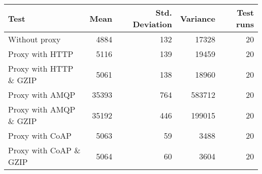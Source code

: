 \begin{tabular}{lrrrr}
\hline
 Test                   &   Mean &   Std. Deviation &   Variance &   Test runs \\
\hline
 Without proxy          &   4884 &              132 &      17328 &          20 \\
 Proxy with HTTP        &   5116 &              139 &      19459 &          20 \\
 Proxy with HTTP \& GZIP &   5061 &              138 &      18960 &          20 \\
 Proxy with AMQP        &  35393 &              764 &     583712 &          20 \\
 Proxy with AMQP \& GZIP &  35192 &              446 &     199015 &          20 \\
 Proxy with CoAP        &   5063 &               59 &       3488 &          20 \\
 Proxy with CoAP \& GZIP &   5064 &               60 &       3604 &          20 \\
\hline
\end{tabular}